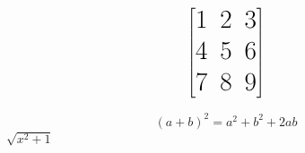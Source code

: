 \documentclass{article}
\begin{document}
	\[
	\huge	\begin{bmatrix}
			
			1 & 2 & 3\\
			4 & 5 & 6\\
			7 & 8 & 9
		\end{bmatrix}	
	\]
	
\huge	\begin{equation}
		(a+b)^2= a^2 + b^2 + 2ab 
	\end{equation}
	\vspace{10px}
	\
\begin{math}
	\sqrt{x^2 +1}
\end{math}
	
\end{document}
